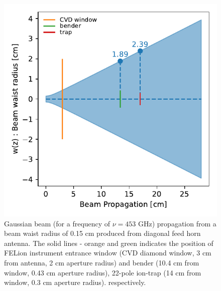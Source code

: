 \begin{figure}[!htb]
    \centering
    \includegraphics[scale=0.7]{figures/measurements/power-curve-453GHz/beam_propagation.pdf}
    \caption{Gaussian beam (for a frequency of $\nu=453$ GHz) propagation from a beam waist radius of 0.15 cm produced from diagonal feed horn antenna. The solid lines - orange and green indicates the position of FELion instrument entrance window (CVD diamond window, 3 cm from antenna, 2 cm aperture radius) and bender (10.4 cm from window, 0.43 cm aperture radius), 22-pole ion-trap (14 cm from window, 0.3 cm aperture radius). respectively.}
    \label{fig:power-curve:beam-propagation}
\end{figure}